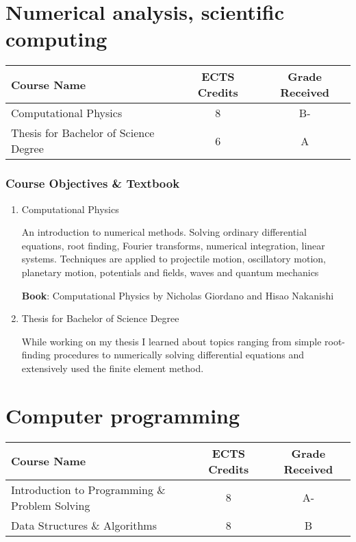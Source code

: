 \documentclass[11pt]{article}
\begin{document}
\section*{Numerical analysis, scientific computing}

\begin{center}
\begin{tabular}{lcc}
Course Name & ECTS Credits & Grade Received \\ \toprule
Computational Physics & 8 & B- \\
Thesis for Bachelor of Science Degree & 6 & A
\end{tabular}
\end{center}

\subsubsection*{Course Objectives \& Textbook}
\begin{enumerate}
    \item Computational Physics

    An introduction to numerical methods. Solving ordinary differential equations, root finding, Fourier transforms, numerical integration, linear systems. Techniques are applied to projectile motion, oscillatory motion, planetary motion, potentials and fields, waves and quantum mechanics
    
    \textbf{Book}: Computational Physics by Nicholas Giordano and Hisao Nakanishi
    
    \item Thesis for Bachelor of Science Degree
    
    While working on my thesis I learned about topics ranging from simple root-finding procedures to numerically solving differential equations and extensively used the finite element method.
\end{enumerate}

\section*{Computer programming}

\begin{center}
\begin{tabular}{lcc}
Course Name & ECTS Credits & Grade Received \\ \toprule
Introduction to Programming \& Problem Solving & 8 & A- \\
Data Structures \& Algorithms & 8 & B
\end{tabular}
\end{center}
\end{document}
